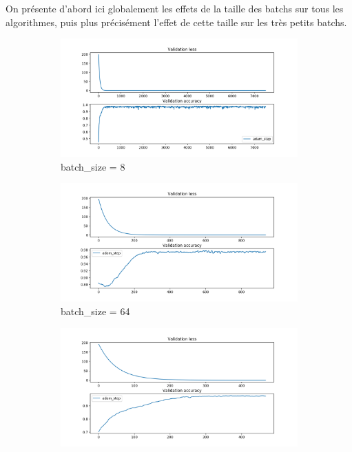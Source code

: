 \documentclass[fleqn,11pt, titlepage, french]{article}
\begin{document}
	On présente d'abord ici globalement les effets de la taille des batchs sur tous les algorithmes, puis plus précisément l'effet de cette taille sur les très petits batchs.
	
			\begin{figure}[H]
		\centering
		\begin{subfigure}{0.45\textwidth}
			\centering
			\includegraphics[scale=0.25]{../gdsvm/exports/mnist-batch8-adam_step.png}
			\caption{batch\_size = 8}
		\end{subfigure}
		\begin{subfigure}{0.45\textwidth}
			\centering
			\includegraphics[scale=0.25]{../gdsvm/exports/mnist-batch64-adam_step.png}
			\caption{batch\_size = 64}
		\end{subfigure}
		\begin{subfigure}{0.45\textwidth}
			\centering
			\includegraphics[scale=0.25]{../gdsvm/exports/mnist-batch128-adam_step.png}

\end{subfigure}
\end{figure}
\end{document}
